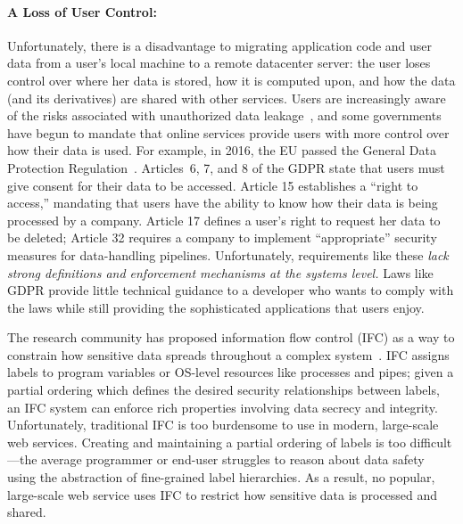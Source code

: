 \paragraph{A Loss of User Control:}
Unfortunately, there is a disadvantage to migrating
application code and user data from a user's local
machine to a remote datacenter server: the user
loses control over where her data is stored, how it is
computed upon, and how the data (and its derivatives)
are shared with other services. Users are increasingly
aware of the risks associated with unauthorized data
leakage~\cite{badCharities,whatsappSued,ashleyMadison},
and some governments have begun to mandate that online
services provide users with more control over how their
data is used. For example, in 2016, the EU passed the
General Data Protection Regulation~\cite{gdpr}.
Articles~6, 7, and 8 of the GDPR state that users
must give consent for their data to be accessed.
Article 15 establishes a ``right to access,'' mandating
that users have the ability to know how their data
is being processed by a company. Article 17 defines
a user's right to request her data to be deleted;
Article 32 requires a company to implement ``appropriate''
security measures for data-handling pipelines.
Unfortunately, requirements like these \textit{lack
	strong definitions and enforcement mechanisms at the systems
	level.} Laws like GDPR provide little technical guidance
to a developer who wants to comply with the laws while
still providing the sophisticated applications that
users enjoy.

The research community has proposed information flow control
(IFC) as a way to constrain how sensitive data spreads
throughout a complex system~\cite{hedin11,li03}. IFC assigns
labels to program variables or OS-level resources like
processes and pipes; given a partial ordering which defines
the desired security relationships between labels, an IFC
system can enforce rich properties involving data secrecy
and integrity. Unfortunately, traditional IFC is too burdensome
to use in modern, large-scale web services. Creating and
maintaining a partial ordering of labels is too difficult---the
average programmer or end-user struggles to reason about data
safety using the abstraction of fine-grained label hierarchies.
As a result, no popular, large-scale web service uses IFC to
restrict how sensitive data is processed and shared.

